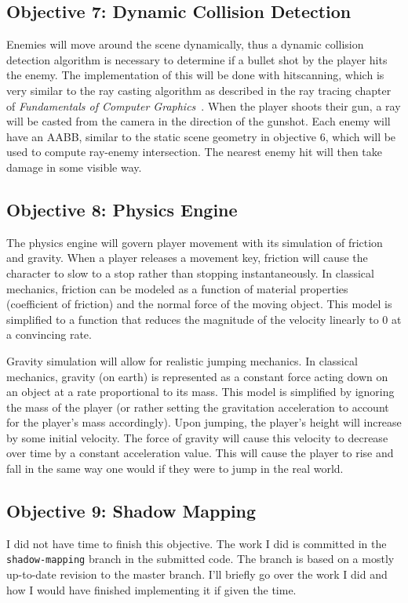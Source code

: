 \documentclass {article}
\begin{document}
\subsection{Objective 7: Dynamic Collision Detection}
Enemies will move around the scene dynamically, thus a dynamic collision detection algorithm is necessary to determine if a bullet shot by the player hits the enemy. The implementation of this will be done with hitscanning, which is very similar to the ray casting algorithm as described in the ray tracing chapter of \textit{Fundamentals of Computer Graphics}~\cite{rtbook}. When the player shoots their gun, a ray will be casted from the camera in the direction of the gunshot. Each enemy will have an AABB, similar to the static scene geometry in objective 6, which will be used to compute ray-enemy intersection. The nearest enemy hit will then take damage in some visible way.


\subsection{Objective 8: Physics Engine}
The physics engine will govern player movement with its simulation of friction and gravity. When a player releases a movement key, friction will cause the character to slow to a stop rather than stopping instantaneously. In classical mechanics, friction can be modeled as a function of material properties (coefficient of friction) and the normal force of the moving object. This model is simplified to a function that reduces the magnitude of the velocity linearly to 0 at a convincing rate.

Gravity simulation will allow for realistic jumping mechanics. In classical mechanics, gravity (on earth) is represented as a constant force acting down on an object at a rate proportional to its mass. This model is simplified by ignoring the mass of the player (or rather setting the gravitation acceleration to account for the player's mass accordingly). Upon jumping, the player's height will increase by some initial velocity. The force of gravity will cause this velocity to decrease over time by a constant acceleration value. This will cause the player to rise and fall in the same way one would if they were to jump in the real world.

\subsection{Objective 9: Shadow Mapping}
I did not have time to finish this objective. The work I did is committed in the \texttt{shadow-mapping} branch in the submitted code. The branch is based on a mostly up-to-date revision to the master branch. I'll briefly go over the work I did and how I would have finished implementing it if given the time.
\end{document}
